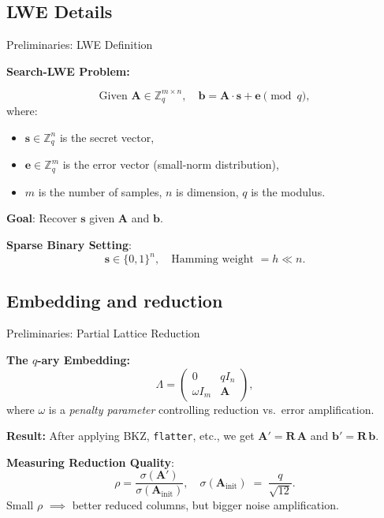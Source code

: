 \documentclass{beamer}
\begin{document}
\subsection*{LWE Details}
\begin{frame}{Preliminaries: LWE Definition}
  
  \textbf{Search-LWE Problem:}
  
  \[
    \text{Given } \mathbf{A} \in \mathbb{Z}_q^{m \times n}, \quad
    \mathbf{b} = \mathbf{A} \cdot \mathbf{s} + \mathbf{e} \pmod{q},
  \]
  where:
  \begin{itemize}
    \item $\mathbf{s} \in \mathbb{Z}_q^n$ is the secret vector,
    \item $\mathbf{e} \in \mathbb{Z}_q^m$ is the error vector (small-norm distribution),
    \item $m$ is the number of samples, $n$ is dimension, $q$ is the modulus.
  \end{itemize}
  
  \vspace{0.3cm}
  \textbf{Goal}: Recover $\mathbf{s}$ given $\mathbf{A}$ and $\mathbf{b}$.
  
  \medskip
  \textbf{Sparse Binary Setting}:
  \[
    \mathbf{s} \in \{0,1\}^n, 
    \quad 
    \text{Hamming weight } = h \ll n.
  \]
  \end{frame}
  
  \subsection*{Embedding and reduction}
  \begin{frame}{Preliminaries: Partial Lattice Reduction}
  
  \textbf{The $q$-ary Embedding:}
  \[
    \Lambda 
    =
    \begin{pmatrix}
    0 & qI_n \\
    \omega I_m & \mathbf{A}
    \end{pmatrix},
  \]
  where $\omega$ is a \emph{penalty parameter} controlling reduction vs.\ error amplification.
  
  \textbf{Result:} After applying BKZ, \texttt{flatter}, etc., we get 
  \(\mathbf{A}' = \mathbf{R}\,\mathbf{A}\) and \(\mathbf{b}' = \mathbf{R}\,\mathbf{b}\).
  
  \medskip
  \textbf{Measuring Reduction Quality}:
  \[
    \rho 
    = 
    \frac{\sigma(\mathbf{A}')}{\sigma(\mathbf{A}_{\text{init}})},
    \quad
    \sigma(\mathbf{A}_{\text{init}}) \;=\; \frac{q}{\sqrt{12}}.
  \]
  Small $\rho$ $\implies$ better reduced columns, but bigger noise amplification.
  \end{frame}
\end{document}
